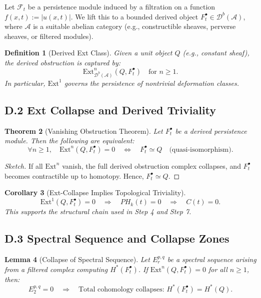 \documentclass[11pt]{article}
\newtheorem{theorem}{Theorem}[section]
\newtheorem{definition}[theorem]{Definition}
\newtheorem{lemma}[theorem]{Lemma}
\newtheorem{corollary}[theorem]{Corollary}
\begin{document}
Let $\mathcal{F}_t$ be a persistence module induced by a filtration on a function $f(x,t) := |u(x,t)|$.  
We lift this to a bounded derived object $F_t^\bullet \in \mathcal{D}^b(\mathcal{A})$, where $\mathcal{A}$ is a suitable abelian category (e.g., constructible sheaves, perverse sheaves, or filtered modules).

\begin{definition}[Derived Ext Class]
Given a unit object $Q$ (e.g., constant sheaf), the derived obstruction is captured by:
\[
\mathrm{Ext}^n_{\mathcal{D}^b(\mathcal{A})}(Q, F^\bullet_t) \quad \text{for } n \geq 1.
\]
In particular, $\mathrm{Ext}^1$ governs the persistence of nontrivial deformation classes.
\end{definition}

\subsection*{D.2 Ext Collapse and Derived Triviality}

\begin{theorem}[Vanishing Obstruction Theorem]
Let $F^\bullet_t$ be a derived persistence module. Then the following are equivalent:
\[
\forall n \geq 1,\quad \mathrm{Ext}^n(Q, F^\bullet_t) = 0
\quad \Longleftrightarrow \quad
F^\bullet_t \simeq Q \quad \text{(quasi-isomorphism)}.
\]
\end{theorem}

\begin{proof}[Sketch]
If all $\mathrm{Ext}^n$ vanish, the full derived obstruction complex collapses, and $F^\bullet_t$ becomes contractible up to homotopy. Hence, $F^\bullet_t \simeq Q$.
\end{proof}

\begin{corollary}[Ext-Collapse Implies Topological Triviality]
\[
\mathrm{Ext}^1(Q, F^\bullet_t) = 0 \quad \Rightarrow \quad PH_k(t) = 0 \quad \Rightarrow \quad C(t) = 0.
\]
This supports the structural chain used in Step 4 and Step 7.
\end{corollary}

\subsection*{D.3 Spectral Sequence and Collapse Zones}

\begin{lemma}[Collapse of Spectral Sequence]
Let $E_r^{p,q}$ be a spectral sequence arising from a filtered complex computing $H^*(F^\bullet_t)$.  
If $\mathrm{Ext}^n(Q, F^\bullet_t) = 0$ for all $n \geq 1$, then:
\[
E_2^{p,q} = 0 \quad \Rightarrow \quad \text{Total cohomology collapses: } H^*(F^\bullet_t) = H^*(Q).
\]
\end{lemma}
\end{document}
